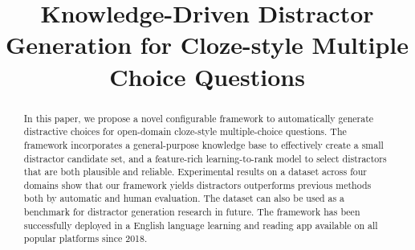 \documentclass[sigconf]{acmart}
\begin{document}
\title{Knowledge-Driven Distractor Generation for Cloze-style Multiple Choice Questions}

%
%  



\begin{abstract}
  In this paper, we propose a novel configurable framework to automatically 
generate distractive choices for open-domain cloze-style multiple-choice questions. 
The framework incorporates a general-purpose knowledge base to 
  effectively create a small distractor candidate set, and a feature-rich learning-to-rank model 
to select distractors that are both plausible and reliable. 
Experimental results on a dataset across four domains show that 
our framework yields distractors outperforms previous methods both 
by automatic and human evaluation. 
The dataset can also be used as a benchmark for distractor generation research in future.
The framework has been successfully deployed in a English language learning and reading app 
available on all popular platforms since 2018.
\end{abstract}
\end{document}
